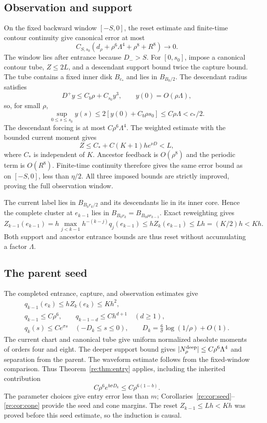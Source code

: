 \documentclass[11pt]{amsart}
\theoremstyle{remark}
\numberwithin{equation}{section}
\begin{document}
\subsection{Observation and support}
On the fixed backward window $[-S,0]$, the reset estimate and
finite-time contour continuity give canonical error at most
\[
 C_{S,s_0}(d_\rho+\rho^6\Lambda^4+\rho^8+R^8)\longrightarrow0.
\]
The window lies after entrance because $D_->S$.
For $[0,s_0]$, impose a canonical contour tube, $Z\le2L$, and
a descendant support bound twice the capture bound. The tube
contains a fixed inner disk $B_{c_*}$ and lies in $B_{B_0/2}$.
The descendant radius satisfies
\[
 D^+y\le C_b\rho+C_{s_0}y^3,\qquad y(0)=O(\rho\Lambda),
\]
so, for small $\rho$,
\[
 \sup_{0\le s\le s_0}y(s)
       \le2[y(0)+C_b\rho s_0]\le C\rho\Lambda<c_*/2.
\]
The descendant forcing is at most $C\rho^6\Lambda^4$.
The weighted estimate with the bounded current moment gives
\begin{equation}\label{fi:obsZ}
 Z\le C_*+C(K+1)he^{\nu D}<L,
\end{equation}
where $C_*$ is independent of $K$. Ancestor feedback is
$O(\rho^8)$ and the periodic term is $O(R^8)$.
Finite-time continuity therefore gives the same error bound as
on $[-S,0]$, less than $\eta/2$. All three imposed bounds are
strictly improved, proving the full observation window.

The current label lies in $B_{B_0r_k/2}$ and its descendants lie
in its inner core. Hence the complete cluster at $e_{k-1}$ lies
in $B_{B_0r_k}=B_{B_0\rho r_{k-1}}$. Exact reweighting gives
\[
 Z_{k-1}(e_{k-1})
 =h\max_{j<k-1}h^{-(k-j)}q_j(e_{k-1})
 \le hZ_k(e_{k-1})\le Lh=(K/2)h<Kh.
\]
Both support and ancestor entrance bounds are thus reset without
accumulating a factor $\Lambda$.


\subsection{The parent seed}
The completed entrance, capture, and observation estimates give
\[
 \begin{gathered}
 q_{k-1}(e_k)\le hZ_k(e_k)\le Kh^2,\\
 q_{k-1}\le C\rho^6,\qquad q_{k-1-d}\le Ch^{d+1}\quad(d\ge1),\\
 q_k(s)\le Ce^{\sigma s}\quad(-D_k\le s\le0),\qquad
 D_k=\frac6\sigma\log(1/\rho)+O(1).
 \end{gathered}
\]
The current chart and canonical tube give uniform normalized
absolute moments of orders four and eight. The deeper support
bound gives $|N_\rho^{\rm deep}|\le C\rho^6\Lambda^4$ and
separation from the parent. The waveform estimate follows from
the fixed-window comparison. Thus Theorem~\ref{re:thm:entry}
applies, including the inherited contribution
\[
 C\rho^6e^{b\sigma D_k}\le C\rho^{6(1-b)}.
\]
The parameter choices give entry error less than $m$;
Corollaries~\ref{re:cor:seed}--\ref{re:cor:cone} provide the seed
and cone margins. The reset $Z_{k-1}\le Lh<Kh$ was proved before
this seed estimate, so the induction is causal.
\end{document}
